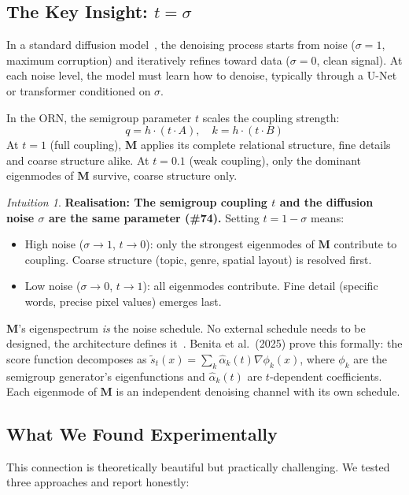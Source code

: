 \documentclass[11pt, a4paper]{article}
\newcommand{\M}{\mathbf{M}}
\theoremstyle{remark}
\newtheorem*{intuition}{Intuition}
\begin{document}
\subsection{The Key Insight: $t = \sigma$}

In a standard diffusion model~\cite{song2023consistency}, the denoising process starts from noise ($\sigma = 1$, maximum corruption) and iteratively refines toward data ($\sigma = 0$, clean signal).
At each noise level, the model must learn how to denoise, typically through a U-Net or transformer conditioned on $\sigma$.

In the ORN, the semigroup parameter $t$ scales the coupling strength:
\[
    q = h \cdot (t \cdot A), \quad k = h \cdot (t \cdot B)
\]
At $t = 1$ (full coupling), $\M$ applies its complete relational structure, fine details and coarse structure alike.
At $t = 0.1$ (weak coupling), only the dominant eigenmodes of $\M$ survive, coarse structure only.

\begin{intuition}
\textbf{Realisation: The semigroup coupling $t$ and the diffusion noise $\sigma$ are the same parameter (\#74).}
Setting $t = 1 - \sigma$ means:
\begin{itemize}[nosep]
    \item High noise ($\sigma \to 1$, $t \to 0$): only the strongest eigenmodes of $\M$ contribute to coupling. Coarse structure (topic, genre, spatial layout) is resolved first.
    \item Low noise ($\sigma \to 0$, $t \to 1$): all eigenmodes contribute. Fine detail (specific words, precise pixel values) emerges last.
\end{itemize}
$\M$'s eigenspectrum \emph{is} the noise schedule.
No external schedule needs to be designed, the architecture defines it~\cite{chen2023deeposg}.
Benita et al.\ (2025) prove this formally: the score function decomposes as $\tilde{s}_t(x) = \sum_k \hat{\alpha}_k(t) \nabla \phi_k(x)$, where $\phi_k$ are the semigroup generator's eigenfunctions and $\hat{\alpha}_k(t)$ are $t$-dependent coefficients.
Each eigenmode of $\M$ is an independent denoising channel with its own schedule.
\end{intuition}

\subsection{What We Found Experimentally}

This connection is theoretically beautiful but practically challenging.
We tested three approaches and report honestly:
\end{document}
